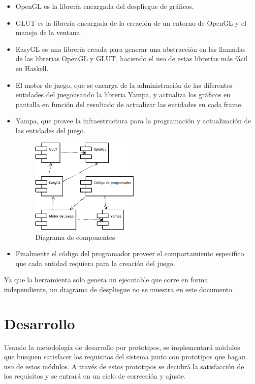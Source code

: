 \begin{itemize}
  \item OpenGL es la librería encargada del despliegue de gráficos.
  \item GLUT es la librería encargada de la creación de un entorno de OpenGL y el manejo de la ventana.
  \item EasyGL es una librería creada para generar una abstracción en las llamadas de las librerias OpenGL y GLUT, haciendo el uso de estas librerías más fácil en Haskell.
  \item El motor de juego, que se encarga de la administración de las diferentes entidades del juegousando la libreria Yampa, y actualiza los gráficos en pantalla en función del resultado de actualizar las entidades en cada frame.
  \item Yampa, que provee la infraestructura para la programación y actualización de las entidades del juego.

\begin{figure}[h]
\centering
\includegraphics[width=0.5\textwidth]{componentes}
\caption[Diagrama de componentes]{Diagrama de componentes}
\label{fig:componentes}
\end{figure}

  \item Finalmente el código del programador proveer el comportamiento específico que cada entidad requiera para la creación del juego.
\end{itemize}

Ya que la herramienta solo genera un ejecutable que corre en forma independiente, un diagrama de despliegue no se muestra en este documento.

\section{Desarrollo}

Usando la metodología de desarrollo por prototipos, se implementará módulos que busquen satisfacer los requisitos del sistema junto con prototipos que hagan uso de estos módulos. A través de estos prototipos se decidirá la satisfacción de los requisitos y se entrará en un ciclo de corrección y ajuste.

